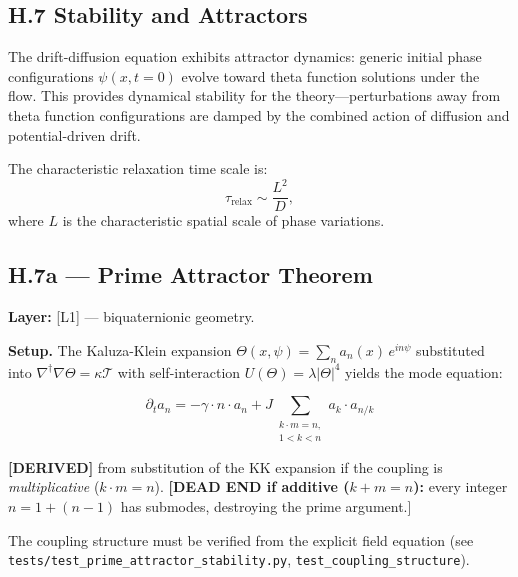 \subsection*{H.7 Stability and Attractors}

The drift-diffusion equation exhibits attractor dynamics: generic initial phase configurations $\psi(x,t=0)$ evolve toward theta function solutions under the flow. This provides dynamical stability for the theory—perturbations away from theta function configurations are damped by the combined action of diffusion and potential-driven drift.

The characteristic relaxation time scale is:
\begin{equation}
\tau_{\text{relax}} \sim \frac{L^2}{D},
\end{equation}
where $L$ is the characteristic spatial scale of phase variations.

\subsection*{H.7a — Prime Attractor Theorem}

\textbf{Layer:} [L1] — biquaternionic geometry.

\bigskip

\noindent\textbf{Setup.} The Kaluza-Klein expansion
$\Theta(x,\psi) = \sum_n a_n(x)\,e^{in\psi}$
substituted into $\nabla^\dagger\nabla\Theta = \kappa\mathcal{T}$ with
self-interaction $U(\Theta) = \lambda|\Theta|^4$ yields the mode equation:

\begin{equation}
\partial_t a_n = -\gamma\cdot n\cdot a_n
  + J\!\!\sum_{\substack{k\cdot m = n,\\ 1<k<n}}\!\! a_k \cdot a_{n/k}
  \label{eq:mode_ODE}
\end{equation}

\textbf{[DERIVED]} from substitution of the KK expansion if the coupling is
\emph{multiplicative} ($k \cdot m = n$). \textbf{[DEAD END if additive ($k+m=n$):}
every integer $n = 1 + (n-1)$ has submodes, destroying the prime argument.]

The coupling structure must be verified from the explicit field equation (see
\texttt{tests/test\_prime\_attractor\_stability.py}, \texttt{test\_coupling\_structure}).

